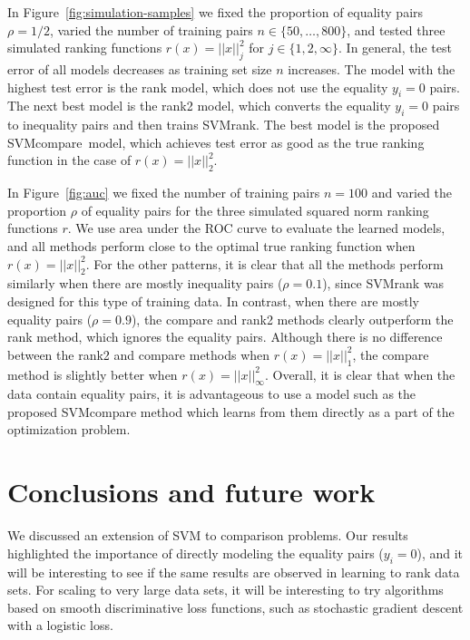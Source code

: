 \documentclass{article}
\newcommand{\SVMcompare}{SVMcompare}
\begin{document}
In Figure~\ref{fig:simulation-samples} we fixed the proportion of
equality pairs $\rho=1/2$, varied the number of training pairs
$n\in\{50,\dots, 800\}$, and tested three simulated ranking functions
$r(x)=||x||^2_j$ for $j\in\{1,2,\infty\}$. In general, the test error
of all models decreases as training set size $n$ increases. The model
with the highest test error is the rank model, which does not use the
equality $y_i=0$ pairs. The next best model is the rank2 model, which
converts the equality $y_i=0$ pairs to inequality pairs and then
trains SVMrank. The best model is the proposed \SVMcompare\ model,
which achieves test error as good as the true ranking function in the
case of $r(x)=||x||^2_2$.

In Figure~\ref{fig:auc} we fixed the number of training pairs $n=100$
and varied the proportion $\rho$ of equality pairs for the three
simulated squared norm ranking functions $r$. We use area under the
ROC curve to evaluate the learned models, and all methods perform
close to the optimal true ranking function when $r(x)=||x||^2_2$. For
the other patterns, it is clear that all the methods perform similarly
when there are mostly inequality pairs ($\rho=0.1$), since SVMrank was
designed for this type of training data. In contrast, when there are
mostly equality pairs ($\rho=0.9$), the compare and rank2 methods
clearly outperform the rank method, which ignores the equality
pairs. Although there is no difference between the rank2 and compare
methods when $r(x)=||x||_1^2$, the compare method is slightly better
when $r(x)=||x||_\infty^2$. Overall, it is clear that when the data
contain equality pairs, it is advantageous to use a model such as the
proposed SVMcompare method which learns from them directly as a part
of the optimization problem.


\section{Conclusions and future work}
\label{sec:conclusions}

We discussed an extension of SVM to comparison problems. Our results
highlighted the importance of directly modeling the equality pairs
($y_i=0$), and it will be interesting to see if the same results are
observed in learning to rank data sets. For scaling to very large data
sets, it will be interesting to try algorithms based on smooth
discriminative loss functions, such as stochastic gradient descent
with a logistic loss.
\end{document}
